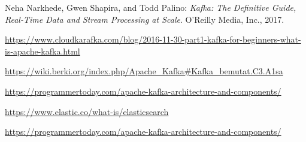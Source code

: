 \begin{thebibliography}{9}

Neha Narkhede, Gwen Shapira, and Todd Palino: \emph{Kafka: The Definitive Guide, Real-Time Data and Stream Processing at Scale}. O'Reilly Media, Inc., 2017.

\url{https://www.cloudkarafka.com/blog/2016-11-30-part1-kafka-for-beginners-what-is-apache-kafka.html}

\url{https://wiki.berki.org/index.php/Apache_Kafka#Kafka_bemutat.C3.A1sa}

\url{https://programmertoday.com/apache-kafka-architecture-and-components/}

\url{https://www.elastic.co/what-is/elasticsearch}

\url{https://programmertoday.com/apache-kafka-architecture-and-components/}
\end{thebibliography}
